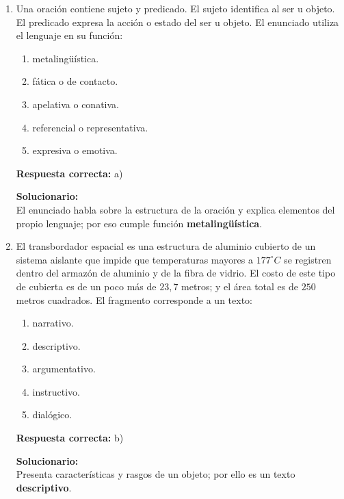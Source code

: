 \begin{enumerate}
	
	\item Una oración contiene sujeto y predicado. El sujeto identifica al ser u objeto. El predicado expresa la acción o estado del ser u objeto. El enunciado utiliza el lenguaje en su función:
	\begin{enumerate}[label=\alph*)]
		\item metalingüística.
		\item fática o de contacto.
		\item apelativa o conativa.
		\item referencial o representativa.
		\item expresiva o emotiva.
	\end{enumerate}
	\textbf{Respuesta correcta:} a)
	
	\vspace{2mm}
	\textbf{Solucionario:}\\
	El enunciado habla sobre la estructura de la oración y explica elementos del propio lenguaje; por eso cumple función \textbf{metalingüística}.
	
	\vspace{6mm}
	
	\item El transbordador espacial es una estructura de aluminio cubierto de un sistema aislante que impide que temperaturas mayores a $177^\circ C$ se registren dentro del armazón de aluminio y de la fibra de vidrio. El costo de este tipo de cubierta es de un poco más de $23,7$ metros; y el área total es de $250$ metros cuadrados. El fragmento corresponde a un texto:
	\begin{enumerate}[label=\alph*)]
		\item narrativo.
		\item descriptivo.
		\item argumentativo.
		\item instructivo.
		\item dialógico.
	\end{enumerate}
	\textbf{Respuesta correcta:} b)
	
	\vspace{2mm}
	\textbf{Solucionario:}\\
	Presenta características y rasgos de un objeto; por ello es un texto \textbf{descriptivo}.
	
	\vspace{6mm}
	

\end{enumerate}
